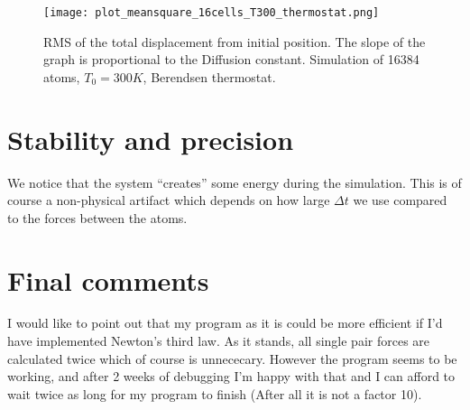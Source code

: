 \documentclass[a4paper,english, 10pt, twoside]{article}
\begin{document}
\begin{figure}[H]
\centering
\texttt{[image: plot\_meansquare\_16cells\_T300\_thermostat.png]}
\caption{RMS of the total displacement from initial position. The slope of the graph 
is proportional to the Diffusion constant. Simulation of 16384 atoms, $T_0=300K$, Berendsen thermostat.}
\label{displacement_300K_berendsen}
\end{figure}

\section{Stability and precision}
We notice that the system ``creates'' some energy during the simulation. This is of course 
a non-physical artifact which depends on how large $\Delta t$ we use compared to the forces 
between the atoms.
\section{Final comments}
I would like to point out that my program as it is could be more efficient if I'd have 
implemented Newton's third law. As it stands, all single pair forces are calculated twice which 
of course is unnececary. However the program seems to be working, and after 2 weeks of 
debugging I'm happy with that and I can afford to wait twice as long for my program to finish 
(After all it is not a factor 10). 
% 
% 
% 
\end{document}
